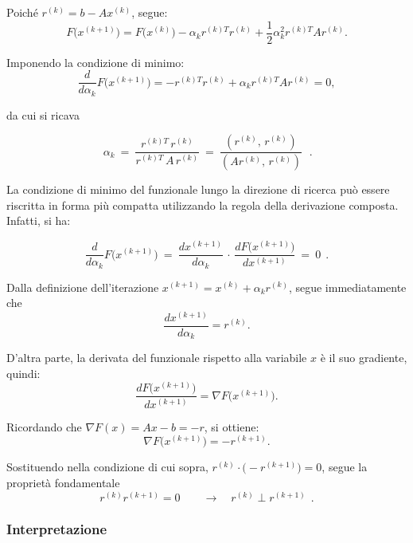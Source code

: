 Poiché $r^{(k)} = b - A x^{(k)}$, segue:
\begin{equation*}
	F\big(x^{(k+1)}\big)
	= F\big(x^{(k)}\big)
	- \alpha_k r^{(k)T} r^{(k)}
	+ \frac{1}{2} \alpha_k^2 r^{(k)T} A r^{(k)}.
\end{equation*}

Imponendo la condizione di minimo:
\begin{equation*}
	\frac{d}{d\alpha_k} F\big(x^{(k+1)}\big)
	= - r^{(k)T} r^{(k)} + \alpha_k r^{(k)T} A r^{(k)} = 0,
\end{equation*}

da cui si ricava

\[\boxed{\,\alpha_k\ =\ \frac{r^{(k)T}\, r^{(k)}}{r^{(k)T}\, A\, r^{(k)}}\ =\ \frac{(r^{(k)},\, r^{(k)})}{(A r^{(k)},\, r^{(k)})}\, }\ \ .\]

La condizione di minimo del funzionale lungo la direzione di ricerca può essere riscritta in forma più compatta utilizzando la regola della derivazione composta. Infatti, si ha:

\begin{equation*}
	\frac{d}{d\alpha_k} F\big(x^{(k+1)}\big)
	\ =\
	\frac{dx^{(k+1)}}{d\alpha_k}
	\,\cdot\,
	\frac{dF\big(x^{(k+1)}\big)}{dx^{(k+1)}}
	\ =\ 0\ \ .
\end{equation*}

Dalla definizione dell'iterazione $x^{(k+1)} = x^{(k)} + \alpha_k r^{(k)}$, segue immediatamente che
\begin{equation*}
	\frac{dx^{(k+1)}}{d\alpha_k} = r^{(k)}.
\end{equation*}

D'altra parte, la derivata del funzionale rispetto alla variabile $x$ è il suo gradiente, quindi:
\begin{equation*}
	\frac{dF\big(x^{(k+1)}\big)}{dx^{(k+1)}} = \nabla F\big(x^{(k+1)}\big).
\end{equation*}

Ricordando che $\nabla F(x) = Ax - b = -r$, si ottiene:
\begin{equation*}
	\nabla F\big(x^{(k+1)}\big) = -r^{(k+1)}.
\end{equation*}

Sostituendo nella condizione di cui sopra, $r^{(k)} \cdot \big(-r^{(k+1)}\big) = 0$, segue la proprietà fondamentale
\begin{equation*}
	r^{(k)} r^{(k+1)} = 0 \qquad \rightarrow \quad r^{(k)}\perp r^{(k+1)} \ \ .
\end{equation*}

\subsubsection{Interpretazione}

